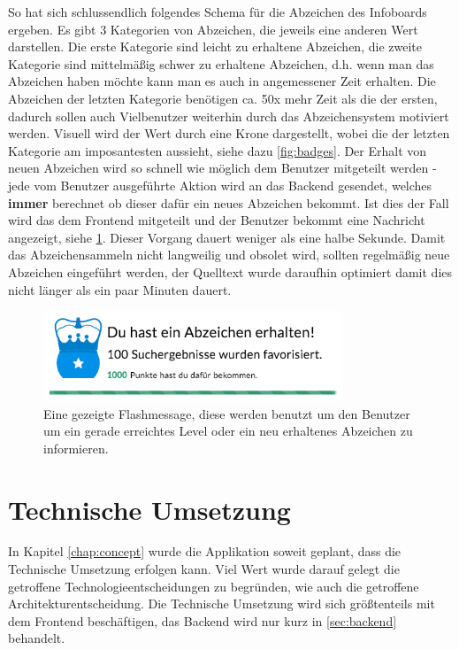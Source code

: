 \documentclass[12pt,twoside]{book}
\begin{document}
So hat sich schlussendlich folgendes Schema für die Abzeichen des Infoboards ergeben. Es gibt 3 Kategorien von Abzeichen, die jeweils eine anderen Wert darstellen. Die erste Kategorie sind leicht zu erhaltene Abzeichen, die zweite Kategorie sind mittelmäßig schwer zu erhaltene Abzeichen, d.h. wenn man das Abzeichen haben möchte kann man es auch in angemessener Zeit erhalten. Die Abzeichen der letzten Kategorie benötigen ca. 50x mehr Zeit als die der ersten, dadurch sollen auch Vielbenutzer weiterhin durch das Abzeichensystem motiviert werden. Visuell wird der Wert durch eine Krone dargestellt, wobei die der letzten Kategorie am imposantesten aussieht, siehe dazu \ref{fig:badges}.
Der Erhalt von neuen Abzeichen wird so schnell wie möglich dem Benutzer mitgeteilt werden - jede vom Benutzer ausgeführte Aktion wird an das Backend gesendet, welches \textbf{immer} berechnet ob dieser dafür ein neues Abzeichen bekommt. Ist dies der Fall wird das dem Frontend mitgeteilt und der Benutzer bekommt eine Nachricht angezeigt, siehe \ref{fig:flashmessage}. Dieser Vorgang dauert weniger als eine halbe Sekunde.
Damit das Abzeichensammeln nicht langweilig und obsolet wird, sollten regelmäßig neue Abzeichen eingeführt werden, der Quelltext wurde daraufhin optimiert damit dies nicht länger als ein paar Minuten dauert.

\begin{figure}[htbp]
    \centering
    \includegraphics[width=0.8\textwidth]{images/infoboard_flashmessage.png}
    \caption{Eine gezeigte Flashmessage, diese werden benutzt um den Benutzer um ein gerade erreichtes Level oder ein neu erhaltenes Abzeichen zu informieren.}
    \label{fig:flashmessage}
\end{figure}

\chapter{Technische Umsetzung}\label{chap:tech}

In Kapitel \ref{chap:concept} wurde die Applikation soweit geplant, dass die Technische Umsetzung erfolgen kann. Viel Wert wurde darauf gelegt die getroffene Technologieentscheidungen zu begründen, wie auch die getroffene Architekturentscheidung.
Die Technische Umsetzung wird sich größtenteils mit dem Frontend beschäftigen, das Backend wird nur kurz in \ref{sec:backend} behandelt.
\end{document}
